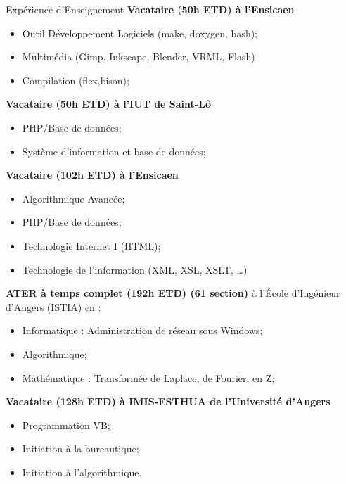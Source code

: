 

\begin{rubric}{Expérience d'Enseignement}
\entry*[2010-2011]
\textbf{Vacataire (50h ETD) à l'Ensicaen}
\begin{itemize} 
\item Outil Développement Logiciels (make, doxygen, bash);
\item Multimédia (Gimp, Inkscape, Blender, VRML, Flash)
\item Compilation (flex,bison);
\end{itemize}
\entry*[]\textbf{Vacataire (50h ETD) à l'IUT de Saint-Lô}
\begin{itemize} 
\item PHP/Base de données;
\item Système d'information et base de données;
\end{itemize}


\entry*[2009-2010]
\textbf{Vacataire (102h ETD) à l'Ensicaen}
\begin{itemize} 
\item Algorithmique Avancée;
\item PHP/Base de données;
\item Technologie Internet I (HTML);
\item Technologie de l'information (XML, XSL, XSLT, \ldots)
\end{itemize}

\entry*[2008-2009]
\textbf{ATER à temps complet (192h ETD) (61 section)} à l'\'Ecole d'Ingénieur d'Angers (ISTIA) en :
\begin{itemize}
\item Informatique : Administration de réseau sous Windows;
\item Algorithmique;
\item Mathématique : Transformée de Laplace, de Fourier, en Z;
\end{itemize}

\entry*[2005-2007]
\textbf{Vacataire (128h ETD) à IMIS-ESTHUA de l'Université d'Angers}
\begin{itemize}
\item Programmation VB;
\item Initiation à la bureautique;
\item Initiation à l'algorithmique.
\end{itemize}


\end{rubric}
